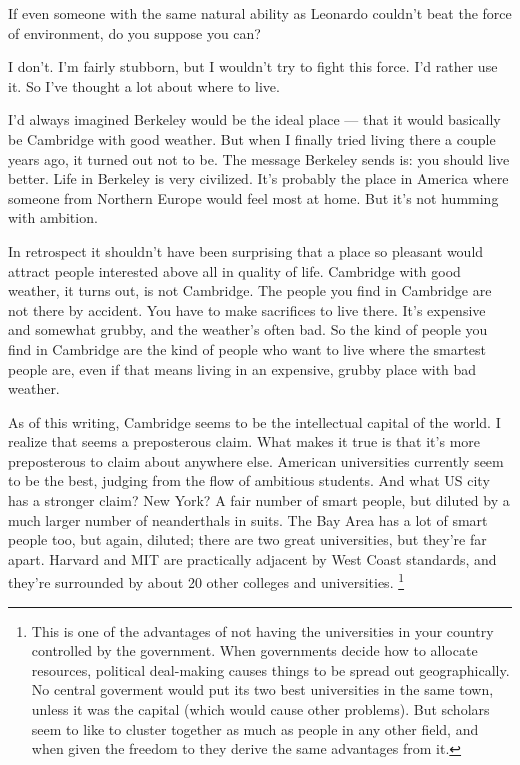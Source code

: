 \documentclass[12pt]{book}
\begin{document}
If even someone with the same natural ability as Leonardo couldn't beat
the force of environment, do you suppose you can?

I don't. I'm fairly stubborn, but I wouldn't try to fight this force.
I'd rather use it. So I've thought a lot about where to live.

I'd always imagined Berkeley would be the ideal place --- that it would
basically be Cambridge with good weather. But when I finally tried
living there a couple years ago, it turned out not to be. The message
Berkeley sends is: you should live better. Life in Berkeley is very
civilized. It's probably the place in America where someone from
Northern Europe would feel most at home. But it's not humming with
ambition.

In retrospect it shouldn't have been surprising that a place so pleasant
would attract people interested above all in quality of life. Cambridge
with good weather, it turns out, is not Cambridge. The people you find
in Cambridge are not there by accident. You have to make sacrifices to
live there. It's expensive and somewhat grubby, and the weather's often
bad. So the kind of people you find in Cambridge are the kind of people
who want to live where the smartest people are, even if that means
living in an expensive, grubby place with bad weather.

As of this writing, Cambridge seems to be the intellectual capital of
the world. I realize that seems a preposterous claim. What makes it true
is that it's more preposterous to claim about anywhere else. American
universities currently seem to be the best, judging from the flow of
ambitious students. And what US city has a stronger claim? New York? A
fair number of smart people, but diluted by a much larger number of
neanderthals in suits. The Bay Area has a lot of smart people too, but
again, diluted; there are two great universities, but they're far apart.
Harvard and MIT are practically adjacent by West Coast standards, and
they're surrounded by about 20 other colleges and universities.
\footnote{This is one of the advantages of not having the universities in
your country controlled by the government. When governments decide how
to allocate resources, political deal-making causes things to be spread
out geographically. No central goverment would put its two best
universities in the same town, unless it was the capital (which would
cause other problems). But scholars seem to like to cluster together as
much as people in any other field, and when given the freedom to they
derive the same advantages from it.}
\end{document}
